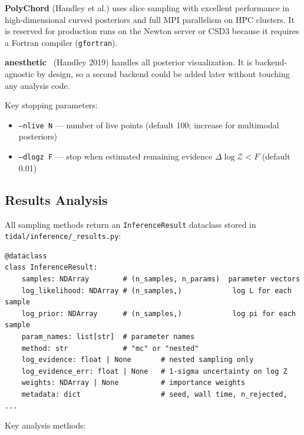 \textbf{PolyChord} (Handley et al.) uses slice sampling with excellent
performance in high-dimensional curved posteriors and full MPI parallelism
on HPC clusters.  It is reserved for production runs on the Newton server
or CSD3 because it requires a Fortran compiler (\texttt{gfortran}).

\textbf{anesthetic}~\cite{handley2019anesthetic} (Handley 2019) handles all
posterior visualization.  It is backend-agnostic by design, so a second
backend could be added later without touching any analysis code.

Key stopping parameters:
\begin{itemize}
  \item \texttt{--nlive N} --- number of live points (default 100; increase for multimodal posteriors)
  \item \texttt{--dlogz F} --- stop when estimated remaining evidence $\Delta\log\mathcal{Z} < F$ (default 0.01)
\end{itemize}

\subsection{Results Analysis}
\label{sec:inference-results}

All sampling methods return an \texttt{InferenceResult} dataclass stored in
\texttt{tidal/inference/\_results.py}:

\begin{lstlisting}[style=python]
@dataclass
class InferenceResult:
    samples: NDArray        # (n_samples, n_params)  parameter vectors
    log_likelihood: NDArray # (n_samples,)            log L for each sample
    log_prior: NDArray      # (n_samples,)            log pi for each sample
    param_names: list[str]  # parameter names
    method: str             # "mc" or "nested"
    log_evidence: float | None       # nested sampling only
    log_evidence_err: float | None   # 1-sigma uncertainty on log Z
    weights: NDArray | None          # importance weights
    metadata: dict                   # seed, wall time, n_rejected, ...
\end{lstlisting}

Key analysis methods:

